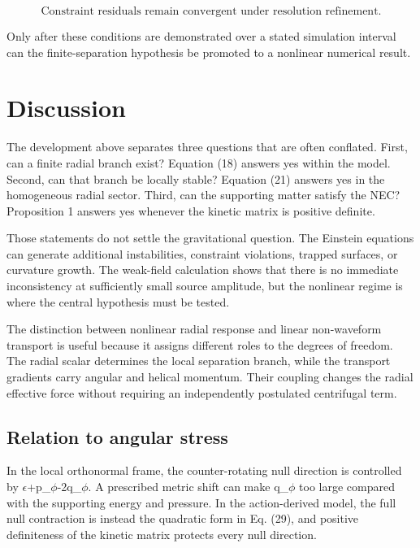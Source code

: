 \documentclass[aps,prd,preprint,nofootinbib,superscriptaddress]{revtex4-2}
\begin{document}
\begin{equation}
\text{Constraint residuals remain convergent under resolution refinement.}
\tag{47}\label{eq:47}
\end{equation}

Only after these conditions are demonstrated over a stated simulation interval can the finite-separation hypothesis be promoted to a nonlinear numerical result.


\section{Discussion}

The development above separates three questions that are often conflated. First, can a finite radial branch exist? Equation (18) answers yes within the model. Second, can that branch be locally stable? Equation (21) answers yes in the homogeneous radial sector. Third, can the supporting matter satisfy the NEC? Proposition 1 answers yes whenever the kinetic matrix is positive definite.


Those statements do not settle the gravitational question. The Einstein equations can generate additional instabilities, constraint violations, trapped surfaces, or curvature growth. The weak-field calculation shows that there is no immediate inconsistency at sufficiently small source amplitude, but the nonlinear regime is where the central hypothesis must be tested.


The distinction between nonlinear radial response and linear non-waveform transport is useful because it assigns different roles to the degrees of freedom. The radial scalar determines the local separation branch, while the transport gradients carry angular and helical momentum. Their coupling changes the radial effective force without requiring an independently postulated centrifugal term.


\subsection{Relation to angular stress}

In the local orthonormal frame, the counter-rotating null direction is controlled by $\epsilon$+p\_$\phi$-2q\_$\phi$. A prescribed metric shift can make q\_$\phi$ too large compared with the supporting energy and pressure. In the action-derived model, the full null contraction is instead the quadratic form in Eq. (29), and positive definiteness of the kinetic matrix protects every null direction.
\end{document}
